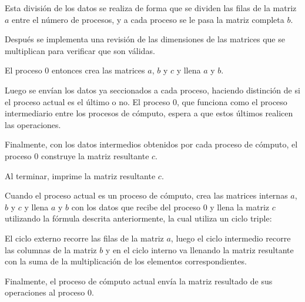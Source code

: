 \documentclass[12pt,a4paper]{article}
\begin{document}
Esta división de los datos se realiza de forma que se dividen las filas de la matriz $a$ entre el número de procesos, y a cada proceso se le pasa la matriz completa $b$.

Después se implementa una revisión de las dimensiones de las matrices que se multiplican para verificar que son válidas.

El proceso 0 entonces crea las matrices  $a$, $b$ y $c$ y llena $a$ y $b$.

Luego se envían los datos ya seccionados a cada proceso, haciendo distinción de si el proceso actual es el último o no.
El proceso 0, que funciona como el proceso intermediario entre los procesos de cómputo, espera a que estos últimos realicen las operaciones. 

Finalmente, con los datos intermedios obtenidos por cada proceso de cómputo, el proceso 0 construye la matriz resultante $c$.

Al terminar, imprime la matriz resultante $c$.

Cuando el proceso actual es un proceso de cómputo, crea las matrices internas $a$, $b$ y $c$ y llena $a$ y $b$ con los datos que recibe del proceso 0 y llena la matriz $c$ utilizando la fórmula descrita anteriormente, la cual utiliza un ciclo triple:

El ciclo externo recorre las filas de la matriz $a$, luego el ciclo intermedio recorre las columnas de la matriz $b$ y en el ciclo interno va llenando la matriz resultante con la suma de la multiplicación de los elementos correspondientes.

Finalmente, el proceso de cómputo actual envía la matriz resultado de sus operaciones al proceso 0.
\end{document}
